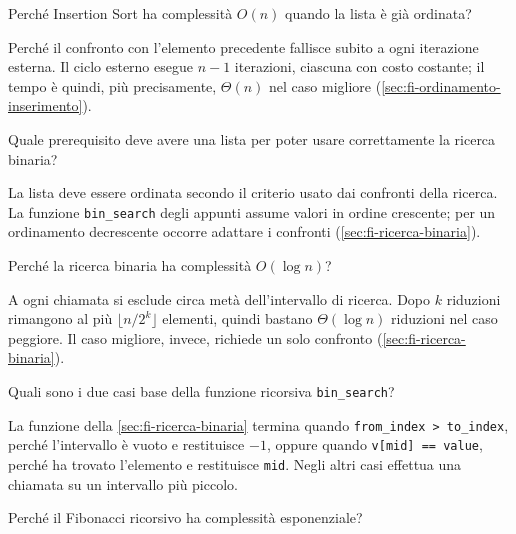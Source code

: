 \begin{exercise}
\label{ex:fi-esercizi-ricerca-ordinamento-inserimento-lineare}
Perché Insertion Sort ha complessità \(O(n)\)
quando la lista è già ordinata?
\end{exercise}

Perché il confronto con l'elemento precedente fallisce
subito a ogni iterazione esterna. Il ciclo esterno esegue
\(n-1\) iterazioni, ciascuna con costo costante; il tempo
è quindi, più precisamente, \(\Theta(n)\) nel caso migliore
(\cref{sec:fi-ordinamento-inserimento}).

\begin{exercise}
\label{ex:fi-esercizi-ricerca-ordinamento-binaria-precondizione}
Quale prerequisito deve avere una lista per poter usare
correttamente la ricerca binaria?
\end{exercise}

La lista deve essere ordinata secondo il criterio usato
dai confronti della ricerca. La funzione \texttt{bin\_search}
degli appunti assume valori in ordine crescente; per un
ordinamento decrescente occorre adattare i confronti
(\cref{sec:fi-ricerca-binaria}).

\begin{exercise}
\label{ex:fi-esercizi-ricerca-ordinamento-binaria-logaritmo}
Perché la ricerca binaria ha complessità \(O(\log n)\)?
\end{exercise}

A ogni chiamata si esclude circa metà dell'intervallo
di ricerca. Dopo \(k\) riduzioni rimangono al più
\(\lfloor n/2^k\rfloor\) elementi, quindi bastano
\(\Theta(\log n)\) riduzioni nel caso peggiore.
Il caso migliore, invece, richiede un solo confronto
(\cref{sec:fi-ricerca-binaria}).

\begin{exercise}
\label{ex:fi-esercizi-ricerca-ordinamento-binaria-casi-base}
Quali sono i due casi base della funzione ricorsiva
\texttt{bin\_search}?
\end{exercise}

La funzione della \cref{sec:fi-ricerca-binaria} termina
quando \lstinline|from_index > to_index|, perché l'intervallo
è vuoto e restituisce \(-1\), oppure quando
\lstinline|v[mid] == value|, perché ha trovato l'elemento
e restituisce \texttt{mid}. Negli altri casi effettua una
chiamata su un intervallo più piccolo.

\begin{exercise}
\label{ex:fi-esercizi-ricerca-ordinamento-fibonacci-esponenziale}
Perché il Fibonacci ricorsivo ha complessità esponenziale?
\end{exercise}

